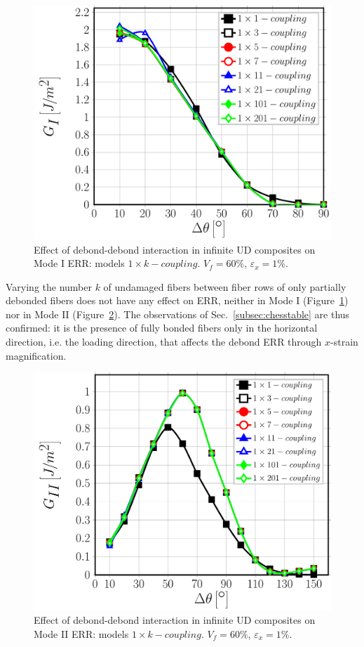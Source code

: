 \documentclass[smallextended]{svjour3}       %
\begin{document}
\begin{figure}[!h]
\centering
\includegraphics[width=\textwidth]{1xk-coupling-vf60-GI.pdf}
\caption{Effect of debond-debond interaction in infinite UD composites on Mode I ERR: models $1\times k-coupling$. $V_{f}=60\%$, $\varepsilon_{x}=1\%$.}\label{fig:horizontalGI}
\end{figure}

Varying the number $k$ of undamaged fibers between fiber rows of only partially debonded fibers does not have any effect on ERR, neither in Mode I (Figure~\ref{fig:horizontalGI}) nor in Mode II (Figure~\ref{fig:horizontalGII}). The observations of Sec.~\ref{subsec:chesstable} are thus confirmed: it is the presence of fully bonded fibers only in the horizontal direction, i.e. the loading direction, that affects the debond ERR through $x$-strain magnification.

\begin{figure}[!h]
\centering
\includegraphics[width=\textwidth]{1xk-coupling-vf60-GII.pdf}
\caption{Effect of debond-debond interaction in infinite UD composites on Mode II ERR: models $1\times k-coupling$. $V_{f}=60\%$, $\varepsilon_{x}=1\%$.}\label{fig:horizontalGII}
\end{figure}
\end{document}
